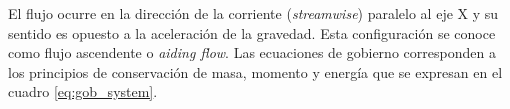 \begin{figure}[H]
 \centering
 \caption{} 
 \label{fig:sistem_domain}
\end{figure}



El flujo ocurre en la dirección de la corriente (\textit{streamwise}) paralelo al eje X y su sentido es opuesto a la aceleración de la gravedad. Esta configuración se conoce como flujo ascendente o \textit{aiding flow}. Las ecuaciones de gobierno corresponden a los principios de conservación de masa, momento y energía que se expresan en el cuadro \ref{eq:gob_system}.

